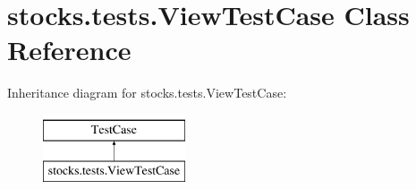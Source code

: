 \hypertarget{classstocks_1_1tests_1_1_view_test_case}{}\section{stocks.\+tests.\+View\+Test\+Case Class Reference}
\label{classstocks_1_1tests_1_1_view_test_case}
Inheritance diagram for stocks.\+tests.\+View\+Test\+Case\+:\begin{figure}[H]
\begin{center}
\leavevmode
\includegraphics[height=2.000000cm]{classstocks_1_1tests_1_1_view_test_case}
\end{center}
\end{figure}
